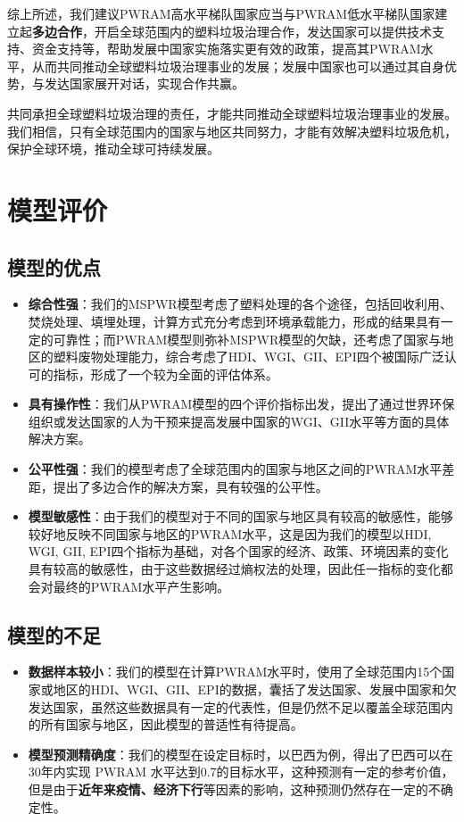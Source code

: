 \documentclass[UTF8, fontset=windows]{mcmthesis}
\begin{document}
综上所述，我们建议PWRAM高水平梯队国家应当与PWRAM低水平梯队国家建立起\textbf{多边合作}，开启全球范围内的塑料垃圾治理合作，发达国家可以提供技术支持、资金支持等，帮助发展中国家实施落实更有效的政策，提高其PWRAM水平，从而共同推动全球塑料垃圾治理事业的发展；发展中国家也可以通过其自身优势，与发达国家展开对话，实现合作共赢。

共同承担全球塑料垃圾治理的责任，才能共同推动全球塑料垃圾治理事业的发展。我们相信，只有全球范围内的国家与地区共同努力，才能有效解决塑料垃圾危机，保护全球环境，推动全球可持续发展。

\section{模型评价}

\subsection{模型的优点}

\begin{itemize}
  \item \textbf{综合性强}：我们的MSPWR模型考虑了塑料处理的各个途径，包括回收利用、焚烧处理、填埋处理，计算方式充分考虑到环境承载能力，形成的结果具有一定的可靠性；而PWRAM模型则弥补MSPWR模型的欠缺，还考虑了国家与地区的塑料废物处理能力，综合考虑了HDI、WGI、GII、EPI四个被国际广泛认可的指标，形成了一个较为全面的评估体系。
  \item \textbf{具有操作性}：我们从PWRAM模型的四个评价指标出发，提出了通过世界环保组织或发达国家的人为干预来提高发展中国家的WGI、GII水平等方面的具体解决方案。
  \item \textbf{公平性强}：我们的模型考虑了全球范围内的国家与地区之间的PWRAM水平差距，提出了多边合作的解决方案，具有较强的公平性。
  \item \textbf{模型敏感性}：由于我们的模型对于不同的国家与地区具有较高的敏感性，能够较好地反映不同国家与地区的PWRAM水平，这是因为我们的模型以HDI, WGI, GII, EPI四个指标为基础，对各个国家的经济、政策、环境因素的变化具有较高的敏感性，由于这些数据经过熵权法的处理，因此任一指标的变化都会对最终的PWRAM水平产生影响。
\end{itemize}

\subsection{模型的不足}

\begin{itemize}
  \item \textbf{数据样本较小}：我们的模型在计算PWRAM水平时，使用了全球范围内15个国家或地区的HDI、WGI、GII、EPI的数据，囊括了发达国家、发展中国家和欠发达国家，虽然这些数据具有一定的代表性，但是仍然不足以覆盖全球范围内的所有国家与地区，因此模型的普适性有待提高。
  \item \textbf{模型预测精确度}：我们的模型在设定目标时，以巴西为例，得出了巴西可以在30年内实现 PWRAM 水平达到0.7的目标水平，这种预测有一定的参考价值，但是由于\textbf{近年来疫情、经济下行}等因素的影响，这种预测仍然存在一定的不确定性。
\end{itemize}
\end{document}
